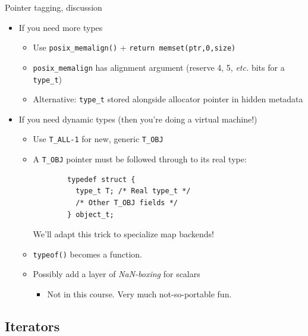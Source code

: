 \begin{frame}[fragile]{Pointer tagging, discussion}

  \begin{itemize}
  \item If you need more types
    \begin{itemize}
    \item Use \lstinline{posix_memalign()} + \lstinline{return memset(ptr,0,size)}
    \item \lstinline{posix_memalign} has alignment argument (reserve 4, 5, {\em etc.} bits for a \lstinline{type_t})
    \item Alternative: \lstinline{type_t} stored alongside allocator pointer in hidden metadata
    \end{itemize}
  \item If you need dynamic types (then you're doing a virtual machine!)
    \begin{itemize}
    \item Use \lstinline{T_ALL-1} for new, generic \lstinline{T_OBJ}
    \item A \lstinline{T_OBJ} pointer must be followed through to its real type:
      \begin{lstlisting}
        typedef struct {
          type_t T; /* Real type_t */
          /* Other T_OBJ fields */
        } object_t;
      \end{lstlisting}

      We'll adapt this trick to specialize map backends!
    \item \lstinline{typeof()} becomes a function.
    \item Possibly add a layer of {\em NaN-boxing} for scalars
      \begin{itemize}
      \item Not in this course. Very much not-so-portable fun.
      \end{itemize}
    \end{itemize}
  \end{itemize}

\end{frame}


\subsection{Iterators}

